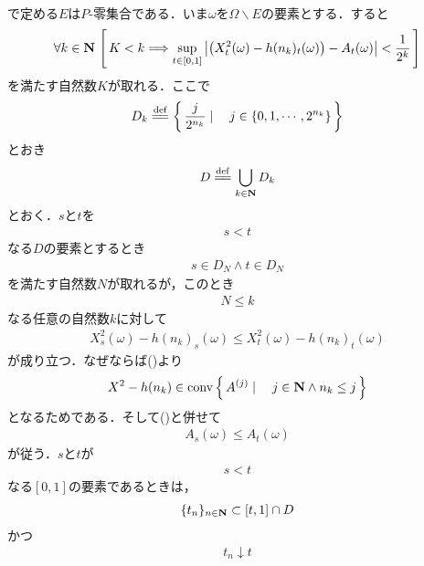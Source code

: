 \begin{sketch}
\begin{description}
\begin{align}
				\end{align}
				で定める$E$は$P$-零集合である．いま$\omega$を$\Omega \backslash E$の要素とする．すると
				\begin{align}
					\forall k \in \mathbf{N}\,
					\left[\, K < k \Longrightarrow \operatorname*{sup}_{t \in [0,1]} \left|\left(X^2_t(\omega) - h(n_k)_t(\omega)\right) - A_t(\omega)\right| < \frac{1}{2^k}\, \right]
					\label{fom:thm_decomposition_of_square_integrable_martingales_4}
				\end{align}
				を満たす自然数$K$が取れる．ここで
				\begin{align}
					D_k \defeq \Set{\frac{j}{2^{n_k}}}{j \in \{0,1,\cdots,2^{n_k}\}}
				\end{align}
				とおき
				\begin{align}
					D \defeq \bigcup_{k \in \Natural} D_k
				\end{align}
				とおく．$s$と$t$を
				\begin{align}
					s < t
				\end{align}
				なる$D$の要素とするとき
				\begin{align}
					s \in D_N \wedge t \in D_N
				\end{align}
				を満たす自然数$N$が取れるが，このとき
				\begin{align}
					N \leq k
				\end{align}
				なる任意の自然数$k$に対して
				\begin{align}
					X^2_s(\omega) - h(n_k)_s(\omega) \leq X^2_t(\omega) - h(n_k)_t(\omega)
				\end{align}
				が成り立つ．なぜならば()より
				\begin{align}
					X^2 - h(n_k) \in \operatorname*{conv} \left\{\, A^{(j)} \mid \quad j \in \mathbf{N} \wedge n_k \leq j\, \right\}
				\end{align}
				となるためである．そして()と併せて
				\begin{align}
					A_s(\omega) \leq A_t(\omega)
				\end{align}
				が従う．$s$と$t$が
				\begin{align}
					s < t
				\end{align}
				なる$[0,1]$の要素であるときは，
				\begin{align}
					\{t_n\}_{n \in \mathbf{N}} \subset [t,1] \cap D
				\end{align}
				かつ
				\begin{align}
					t_n \downarrow t
				\end{align}

\end{description}
\end{sketch}
